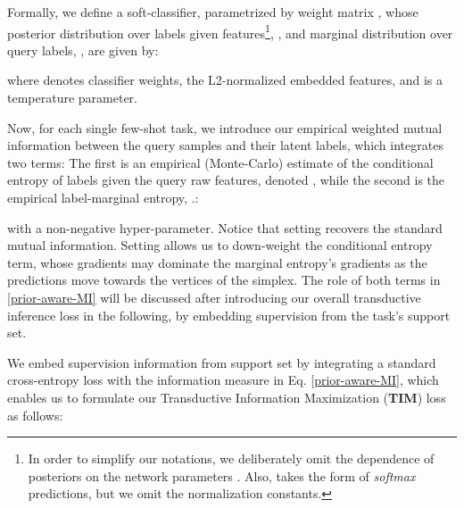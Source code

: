 \documentclass{article}
\begin{document}
    	Formally, we define a soft-classifier, parametrized by weight matrix , whose posterior distribution over labels given features\footnote{In order to simplify our  notations, we deliberately omit the dependence of posteriors  on the network parameters . Also,  takes the form of \emph{softmax} predictions, but we omit the normalization constants.}, , and marginal distribution over query labels, , are given by:
    	
    	where  denotes classifier weights,  the L2-normalized embedded features, and  is a temperature parameter. 
    
         Now, for each single few-shot task, we introduce our empirical weighted mutual information between the query samples and their latent labels, which integrates two terms: The first is an empirical (Monte-Carlo) estimate of the conditional entropy of labels given the query raw features, denoted , while the second is the empirical label-marginal entropy, .:
        
        with  a non-negative hyper-parameter. Notice that setting  recovers the standard mutual information. Setting  allows us to down-weight the conditional entropy term, whose gradients may
        dominate the marginal entropy's gradients as the predictions move towards the vertices of the simplex. The role of both terms in \eqref{prior-aware-MI} will be discussed after introducing our overall transductive inference loss in the following, by embedding supervision from the task's support set. 


        We embed supervision information from support set  by integrating a standard cross-entropy loss  with the information measure in Eq. \eqref{prior-aware-MI}, which enables us to formulate our Transductive Information Maximization (\textbf{TIM}) loss as follows:
\end{document}
